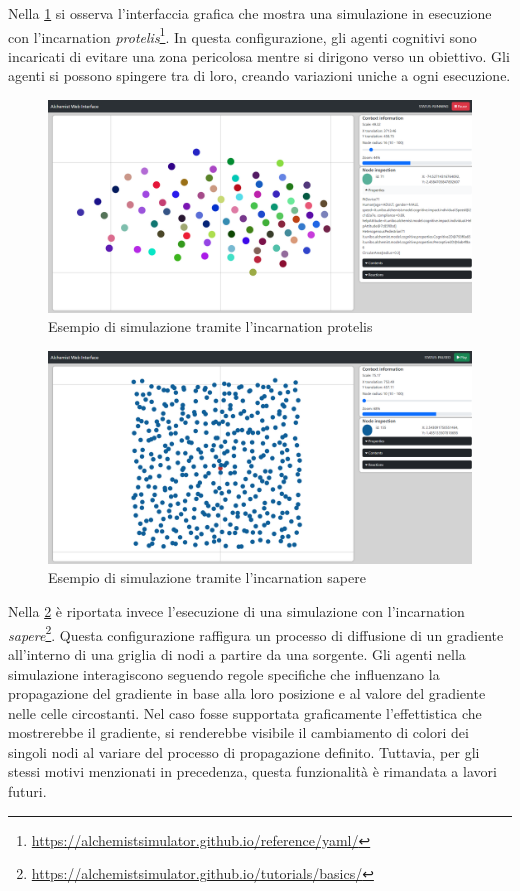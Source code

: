 Nella \cref{fig:protelis-example} si osserva l'interfaccia grafica che mostra una simulazione in esecuzione con l'incarnation \textit{protelis}\footnote{\url{https://alchemistsimulator.github.io/reference/yaml/}}. In questa configurazione, gli agenti cognitivi sono incaricati di evitare una zona pericolosa mentre si dirigono verso un obiettivo. Gli agenti si possono spingere tra di loro, creando variazioni uniche a ogni esecuzione.
\begin{figure}
	\centering
	\includegraphics[scale=0.22]{imgs/screens/example_protelis.png}
	\caption{Esempio di simulazione tramite l'incarnation protelis}
	\label{fig:protelis-example}
\end{figure}
\begin{figure}
	\centering
	\includegraphics[scale=0.22]{imgs/screens/example_sapere.png}
	\caption{Esempio di simulazione tramite l'incarnation sapere}
	\label{fig:sapere-example}
\end{figure}

Nella \cref{fig:sapere-example} è riportata invece l'esecuzione di una simulazione con l'incarnation \textit{sapere}\footnote{\url{https://alchemistsimulator.github.io/tutorials/basics/}}. Questa configurazione raffigura un processo di diffusione di un gradiente all'interno di una griglia di nodi a partire da una sorgente. Gli agenti nella simulazione interagiscono seguendo regole specifiche che influenzano la propagazione del gradiente in base alla loro posizione e al valore del gradiente nelle celle circostanti. 
Nel caso fosse supportata graficamente l'effettistica che mostrerebbe il gradiente, si renderebbe visibile il cambiamento di colori dei singoli nodi al variare del processo di propagazione definito. Tuttavia, per gli stessi motivi menzionati in precedenza, questa funzionalità è rimandata a lavori futuri.

